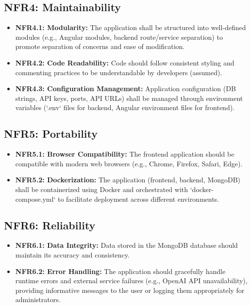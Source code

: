 \subsection{NFR4: Maintainability}
\begin{itemize}
    \item \textbf{NFR4.1: Modularity:} The application shall be structured into well-defined modules (e.g., Angular modules, backend route/service separation) to promote separation of concerns and ease of modification.
    \item \textbf{NFR4.2: Code Readability:} Code should follow consistent styling and commenting practices to be understandable by developers (assumed).
    \item \textbf{NFR4.3: Configuration Management:} Application configuration (DB strings, API keys, ports, API URLs) shall be managed through environment variables (`.env` files for backend, Angular environment files for frontend).
\end{itemize}

\subsection{NFR5: Portability}
\begin{itemize}
    \item \textbf{NFR5.1: Browser Compatibility:} The frontend application should be compatible with modern web browsers (e.g., Chrome, Firefox, Safari, Edge).
    \item \textbf{NFR5.2: Dockerization:} The application (frontend, backend, MongoDB) shall be containerized using Docker and orchestrated with `docker-compose.yml` to facilitate deployment across different environments.
\end{itemize}

\subsection{NFR6: Reliability}
\begin{itemize}
    \item \textbf{NFR6.1: Data Integrity:} Data stored in the MongoDB database should maintain its accuracy and consistency.
    \item \textbf{NFR6.2: Error Handling:} The application should gracefully handle runtime errors and external service failures (e.g., OpenAI API unavailability), providing informative messages to the user or logging them appropriately for administrators.
\end{itemize}

